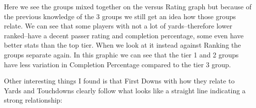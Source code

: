 \documentclass[10pt]{article}
\begin{document}
\hfill
{}%
\par
Here we see the groups mixed together on the versus Rating graph but because of the previous knowledge of the 3 groups we still get an idea how those groups relate. We can see that some players with not a lot of yards--therefore lower ranked--have a decent passer rating and completion percentage, some even have better stats than the top tier. When we look at it instead against Ranking the groups separate again. In this graphic we can see that the tier 1 and 2 groups have less variation in Completion Percentage compared to the tier 3 group.
\par Other interesting things I found is that First Downs with how they relate to Yards and Touchdowns clearly follow what looks like a straight line indicating a strong relationship:
\pagebreak
\par
{}%
\hfill
{}%
\end{document}
